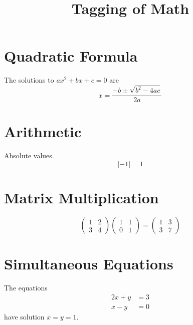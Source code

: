 \documentclass{article}
\title{Tagging of Math}
\begin{document}
\section{Quadratic Formula}
The solutions to $ax^2+bx+c=0$ are
\[
x=\frac{-b \pm \sqrt{b^2-4ac}}{2a}
\]

\section{Arithmetic}
Absolute values.
\[ \lvert -1\rvert = 1 \]


\section{Matrix Multiplication}
\[
  \begin{pmatrix}
    1&2\\3&4
  \end{pmatrix}
  \begin{pmatrix}
    1&1\\0&1
  \end{pmatrix}
   =
  \begin{pmatrix}
    1&3\\3&7
  \end{pmatrix}
\]


\section{Simultaneous Equations}
The equations
\begin{align}
  2x+y&=3\\
  x-y&=0
\end{align}
have solution $x=y=1$.
\end{document}
